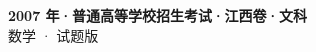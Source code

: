 \documentclass[zihao=-4, a4paper]{ctexart}
\begin{document}
\begin{center}
  {\Large\bfseries 2007 年·普通高等学校招生考试·江西卷·文科}\\[4pt]
  {\large 数学 · 试题版}
\end{center}
\medskip
{}

\end{document}
